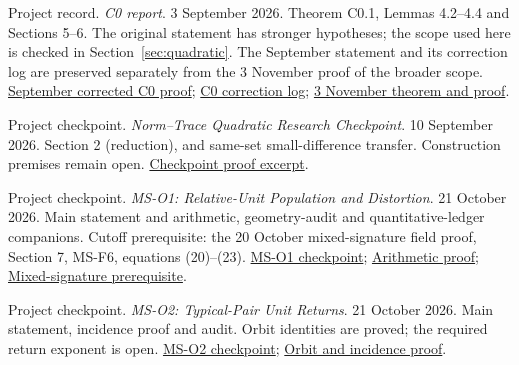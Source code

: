 Project record. \emph{C0 report}. 3 September 2026. Theorem C0.1, Lemmas 4.2--4.4 and Sections 5--6. The original statement has stronger hypotheses; the scope used here is checked in Section~\ref{sec:quadratic}. The September statement and its correction log are preserved separately from the 3 November proof of the broader scope. \href{https://github.com/hnt119/polynomial-image-compression/blob/145d0e5a6ff725ab13cbb5c696bf335352e6f4a1/research/report-source-supplement/c0/Phase_C0_Corrected.md}{September corrected C0 proof}; \href{https://github.com/hnt119/polynomial-image-compression/blob/145d0e5a6ff725ab13cbb5c696bf335352e6f4a1/research/report-source-supplement/c0/C0_CORRECTION_LOG.md}{C0 correction log}; \href{https://github.com/hnt119/polynomial-image-compression/blob/145d0e5a6ff725ab13cbb5c696bf335352e6f4a1/research/report-source-supplement/c0/theorem-and-proof.tex}{3 November theorem and proof}.

Project checkpoint. \emph{Norm--Trace Quadratic Research Checkpoint}. 10 September 2026. Section 2 (reduction), and same-set small-difference transfer. Construction premises remain open. \href{https://github.com/hnt119/polynomial-image-compression/blob/145d0e5a6ff725ab13cbb5c696bf335352e6f4a1/research/report-source-supplement/norm-transfer/norm-transfer.md}{Checkpoint proof excerpt}.

Project checkpoint. \emph{MS-O1: Relative-Unit Population and Distortion}. 21 October 2026. Main statement and arithmetic, geometry-audit and quantitative-ledger companions. Cutoff prerequisite: the 20 October mixed-signature field proof, Section 7, MS-F6, equations (20)--(23). \href{https://github.com/hnt119/polynomial-image-compression/blob/145d0e5a6ff725ab13cbb5c696bf335352e6f4a1/research/notes/2026-10-21-relative-unit-population/README.md}{MS-O1 checkpoint}; \href{https://github.com/hnt119/polynomial-image-compression/blob/145d0e5a6ff725ab13cbb5c696bf335352e6f4a1/research/notes/2026-10-21-relative-unit-population/arithmetic.md}{Arithmetic proof}; \href{https://github.com/hnt119/polynomial-image-compression/blob/145d0e5a6ff725ab13cbb5c696bf335352e6f4a1/research/notes/2026-10-20-mixed-signature/field-units.md}{Mixed-signature prerequisite}.

Project checkpoint. \emph{MS-O2: Typical-Pair Unit Returns}. 21 October 2026. Main statement, incidence proof and audit. Orbit identities are proved; the required return exponent is open. \href{https://github.com/hnt119/polynomial-image-compression/blob/145d0e5a6ff725ab13cbb5c696bf335352e6f4a1/research/notes/2026-10-21-typical-unit-returns/README.md}{MS-O2 checkpoint}; \href{https://github.com/hnt119/polynomial-image-compression/blob/145d0e5a6ff725ab13cbb5c696bf335352e6f4a1/research/notes/2026-10-21-typical-unit-returns/incidences.md}{Orbit and incidence proof}.

